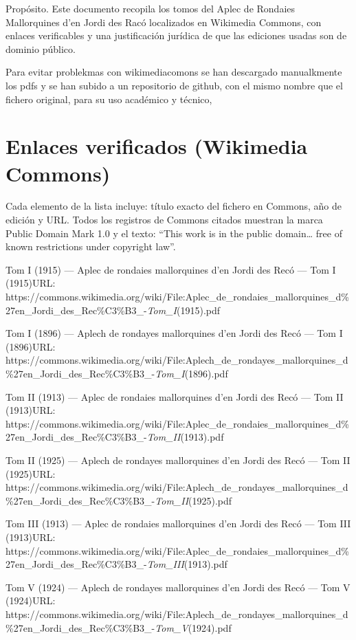 \documentclass[
  letterpaper,
  DIV=11,
  numbers=noendperiod]{scrreprt}
\begin{document}
Propósito. Este documento recopila los tomos del Aplec de Rondaies
Mallorquines d'en Jordi des Racó localizados en Wikimedia Commons, con
enlaces verificables y una justificación jurídica de que las ediciones
usadas son de dominio público.

Para evitar problekmas con wikimediacomons se han descargado
manualkmente los pdfs y se han subido a un repositorio de github, con el
mismo nombre que el fichero original, para su uso académico y técnico,

\section{Enlaces verificados (Wikimedia
Commons)}\label{enlaces-verificados-wikimedia-commons}

Cada elemento de la lista incluye: título exacto del fichero en Commons,
año de edición y URL. Todos los registros de Commons citados muestran la
marca Public Domain Mark 1.0 y el texto: ``This work is in the public
domain\ldots{} free of known restrictions under copyright law''.

Tom I (1915) --- Aplec de rondaies mallorquines d'en Jordi des Recó ---
Tom I (1915)URL:
https://commons.wikimedia.org/wiki/File:Aplec\_de\_rondaies\_mallorquines\_d\%27en\_Jordi\_des\_Rec\%C3\%B3\_-\emph{Tom\_I}(1915).pdf

Tom I (1896) --- Aplech de rondayes mallorquines d'en Jordi des Recó ---
Tom I (1896)URL:
https://commons.wikimedia.org/wiki/File:Aplech\_de\_rondayes\_mallorquines\_d\%27en\_Jordi\_des\_Rec\%C3\%B3\_-\emph{Tom\_I}(1896).pdf

Tom II (1913) --- Aplec de rondaies mallorquines d'en Jordi des Recó ---
Tom II (1913)URL:
https://commons.wikimedia.org/wiki/File:Aplec\_de\_rondaies\_mallorquines\_d\%27en\_Jordi\_des\_Rec\%C3\%B3\_-\emph{Tom\_II}(1913).pdf

Tom II (1925) --- Aplech de rondayes mallorquines d'en Jordi des Recó
--- Tom II (1925)URL:
https://commons.wikimedia.org/wiki/File:Aplech\_de\_rondayes\_mallorquines\_d\%27en\_Jordi\_des\_Rec\%C3\%B3\_-\emph{Tom\_II}(1925).pdf

Tom III (1913) --- Aplec de rondaies mallorquines d'en Jordi des Recó
--- Tom III (1913)URL:
https://commons.wikimedia.org/wiki/File:Aplec\_de\_rondaies\_mallorquines\_d\%27en\_Jordi\_des\_Rec\%C3\%B3\_-\emph{Tom\_III}(1913).pdf

Tom V (1924) --- Aplech de rondayes mallorquines d'en Jordi des Recó ---
Tom V (1924)URL:
https://commons.wikimedia.org/wiki/File:Aplech\_de\_rondayes\_mallorquines\_d\%27en\_Jordi\_des\_Rec\%C3\%B3\_-\emph{Tom\_V}(1924).pdf
\end{document}
